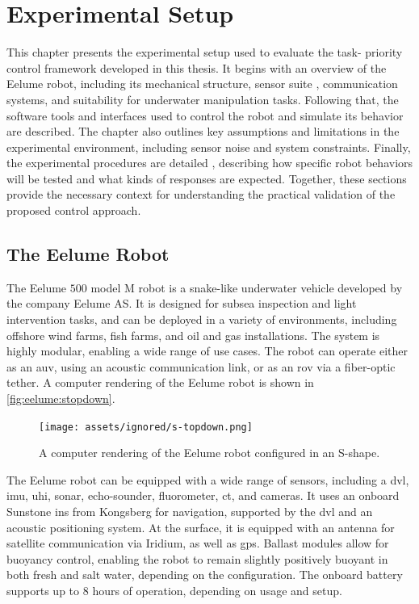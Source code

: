 \chapter{Experimental Setup}

This chapter presents the experimental setup used to evaluate the task-
priority control framework developed in this thesis. It begins with an 
overview of the Eelume robot, including its mechanical structure, sensor suite
, communication systems, and suitability for underwater manipulation tasks. 
Following that, the software tools and interfaces used to control the robot 
and simulate its behavior are described. The chapter also outlines key 
assumptions and limitations in the experimental environment, including sensor 
noise and system constraints. Finally, the experimental procedures are detailed
, describing how specific robot behaviors will be tested and what kinds of 
responses are expected. Together, these sections provide the necessary context 
for understanding the practical validation of the proposed control approach.

\section{The Eelume Robot}

The Eelume \(500\) model M robot is a snake-like underwater vehicle developed by 
the company Eelume AS. It is designed for subsea inspection and light 
intervention tasks, and can be deployed in a variety of environments, 
including offshore wind farms, fish farms, and oil and gas installations. The 
system is highly modular, enabling a wide range of use cases.
The robot can operate either as an \gls{auv}, using an acoustic communication 
link, or as an \gls{rov} via a fiber-optic tether. A computer rendering of the 
Eelume robot is shown in \autoref{fig:eelume:stopdown}.

\begin{figure}[h!]
    \centering
    \texttt{[image: assets/ignored/s-topdown.png]}
    \caption{A computer rendering of the Eelume robot configured in an S-shape.}
    \label{fig:eelume:stopdown}
\end{figure}

The Eelume robot can be equipped with a wide range of sensors, including a \gls{dvl},
\gls{imu}, \gls{uhi}, sonar, echo-sounder, fluorometer, \gls{ct}, and 
cameras. It uses an onboard Sunstone \gls{ins} from Kongsberg for navigation, supported by the \gls{dvl}
and an acoustic positioning system. At the surface, it is equipped with an 
antenna for satellite communication via Iridium, as well as \gls{gps}. Ballast 
modules allow for buoyancy control, enabling the robot to remain slightly 
positively buoyant in both fresh and salt water, depending on the configuration.
The onboard battery supports up to $8$ hours of operation, depending on 
usage and setup.


